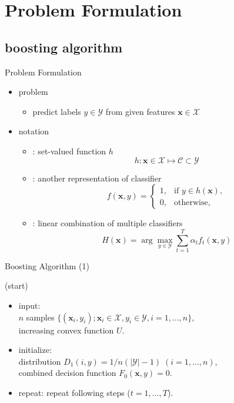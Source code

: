 \documentclass[fleqn,aspectratio=1610]{beamer}
\begin{document}
\section{Problem Formulation}
\label{sec:orgeb84d89}
\subsection{boosting algorithm}
\label{sec:org039f407}
\begin{frame}[label={sec:orge8e56eb}]{Problem Formulation}
\begin{itemize}
\item problem
\begin{itemize}
\item predict labels \(y\in\mathcal{Y}\) from given features
\(\boldsymbol{x}\in\mathcal{X}\)
\end{itemize}
\item notation
\begin{itemize}
\item {}:
set-valued function \(h\)
\begin{equation}
  h: \boldsymbol{x}\in\mathcal{X}\mapsto\mathcal{C}\subset\mathcal{Y}
\end{equation}
\item {}:
another representation of classifier
\begin{equation}
  f(\boldsymbol{x},y)
  =
  \begin{cases}
    1,& \text{if } y\in h(\boldsymbol{x}),\\
    0,& \text{otherwise},
  \end{cases}
\end{equation}
\item {}: 
linear combination of multiple classifiers
\begin{equation}
  H(\boldsymbol{x})=\arg\max_{y\in\mathcal{Y}}%
  \sum_{t=1}^{T}\alpha_t f_t(\boldsymbol{x},y)
\end{equation}
\end{itemize}
\end{itemize}
\end{frame}
\begin{frame}[label={sec:org8579a92}]{Boosting Algorithm (1)}
\begin{block}{(start)}
\begin{itemize}
\item \alert{input:}\\
\(n\) samples
\(\{(\boldsymbol{x}_i,y_i); \boldsymbol{x}_i\in\mathcal{X},y_i\in\mathcal{Y}, i=1,\dots,n\}\),\\
increasing convex function \(U\).
\item \alert{initialize:}\\
distribution \(D_1(i,y)=1/n(|\mathcal{Y}|-1)\;(i=1,\dots,n)\),\\
combined decision function \(F_0(\boldsymbol{x},y)=0\).
\item \alert{repeat:}
repeat following steps (\(t=1,\dots,T\)).
\end{itemize}
\end{block}
\end{frame}
\end{document}
